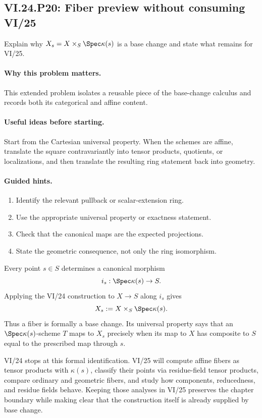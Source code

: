 \subsection*{VI.24.P20: Fiber preview without consuming VI/25}
\begin{problem}\label{prob:vi24-p20}
Explain why $X_s=X\times_S\Spec\kappa(s)$ is a base change and state what remains for VI/25.
\end{problem}

\ifdefined\FullProblemDossiers
\paragraph{Why this problem matters.}
This extended problem isolates a reusable piece of the base-change calculus and records both its categorical and affine content.

\paragraph{Useful ideas before starting.}
Start from the Cartesian universal property.  When the schemes are affine, translate the square contravariantly into tensor products, quotients, or localizations, and then translate the resulting ring statement back into geometry.

\paragraph{Guided hints.}
\begin{enumerate}
\item Identify the relevant pullback or scalar-extension ring.
\item Use the appropriate universal property or exactness statement.
\item Check that the canonical maps are the expected projections.
\item State the geometric consequence, not only the ring isomorphism.
\end{enumerate}

\begin{solution}
Every point $s\in S$ determines a canonical morphism
\[
i_s:\Spec\kappa(s)\to S.
\]
Applying the VI/24 construction to $X\to S$ along $i_s$ gives
\[
X_s:=X\times_S\Spec\kappa(s).
\]
Thus a fiber is formally a base change.  Its universal property says that an $\Spec\kappa(s)$-scheme $T$ maps to $X_s$ precisely when its map to $X$ has composite to $S$ equal to the prescribed map through $s$.

VI/24 stops at this formal identification.  VI/25 will compute affine fibers as tensor products with $\kappa(s)$, classify their points via residue-field tensor products, compare ordinary and geometric fibers, and study how components, reducedness, and residue fields behave.  Keeping those analyses in VI/25 preserves the chapter boundary while making clear that the construction itself is already supplied by base change.
\end{solution}

